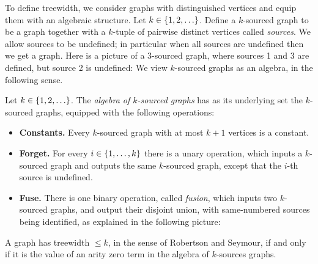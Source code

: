         
 To define treewidth, we consider graphs with distinguished vertices and equip them with an algebraic structure. 
    Let $k \in \{1,2,\ldots\}$. Define a $k$-sourced graph to be a  graph together with a $k$-tuple of pairwise distinct vertices called \emph{sources}. We allow sources to be undefined; in particular when all sources are undefined then we get a graph. Here is a 
    picture of a 3-sourced graph, where sources 1 and 3 are defined, but source 2 is undefined:
    We view  $k$-sourced graphs as an algebra, in the following sense.



    
    \begin{definition}
         Let $k \in \{1,2,\ldots\}$. The \emph{algebra of $k$-sourced graphs} has as its underlying set the  $k$-sourced graphs, equipped with the following operations:
            \begin{itemize}
                \item {\bf Constants.} Every $k$-sourced graph with at most $k+1$ vertices is a constant.
                \item {\bf Forget.} For every $i \in \{1,\ldots,k\}$ there is a unary operation, which inputs a $k$-sourced graph and outputs the same $k$-sourced graph, except that the $i$-th source is undefined. 
                \item {\bf Fuse.} There is one binary operation, called \emph{fusion}, which inputs two $k$-sourced graphs, and output their disjoint union, with same-numbered sources being identified, as explained in the following picture:
            \end{itemize}
        \end{definition}
    
  

    \begin{lemma}
        A graph has treewidth $\le k$, in the sense of Robertson and Seymour,  if and only if it is the value of an arity zero term in the algebra of $k$-sources graphs.
    \end{lemma}

